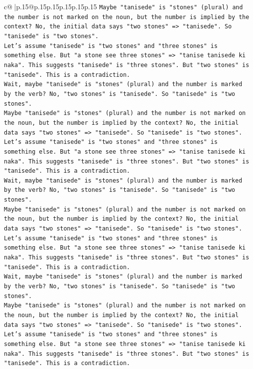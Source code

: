 \documentclass{article}
\begin{document}
{\begin{supertabular}{c@{$\;$}|p{.15\linewidth}@{}p{.15\linewidth}p{.15\linewidth}p{.15\linewidth}p{.15\linewidth}p{.15\linewidth}}
{{{\texttt{Maybe "tanisede" is "stones" (plural) and the number is not marked on the noun, but the number is implied by the context? No, the initial data says "two stones" => "tanisede". So "tanisede" is "two stones".} \\
\texttt{Let's assume "tanisede" is "two stones" and "three stones" is something else. But "a stone see three stones" => "tanise tanisede ki naka". This suggests "tanisede" is "three stones". But "two stones" is "tanisede". This is a contradiction.} \\
\texttt{Wait, maybe "tanisede" is "stones" (plural) and the number is marked by the verb? No, "two stones" is "tanisede". So "tanisede" is "two stones".} \\
\texttt{Maybe "tanisede" is "stones" (plural) and the number is not marked on the noun, but the number is implied by the context? No, the initial data says "two stones" => "tanisede". So "tanisede" is "two stones".} \\
\texttt{Let's assume "tanisede" is "two stones" and "three stones" is something else. But "a stone see three stones" => "tanise tanisede ki naka". This suggests "tanisede" is "three stones". But "two stones" is "tanisede". This is a contradiction.} \\
\texttt{Wait, maybe "tanisede" is "stones" (plural) and the number is marked by the verb? No, "two stones" is "tanisede". So "tanisede" is "two stones".} \\
\texttt{Maybe "tanisede" is "stones" (plural) and the number is not marked on the noun, but the number is implied by the context? No, the initial data says "two stones" => "tanisede". So "tanisede" is "two stones".} \\
\texttt{Let's assume "tanisede" is "two stones" and "three stones" is something else. But "a stone see three stones" => "tanise tanisede ki naka". This suggests "tanisede" is "three stones". But "two stones" is "tanisede". This is a contradiction.} \\
\texttt{Wait, maybe "tanisede" is "stones" (plural) and the number is marked by the verb? No, "two stones" is "tanisede". So "tanisede" is "two stones".} \\
\texttt{Maybe "tanisede" is "stones" (plural) and the number is not marked on the noun, but the number is implied by the context? No, the initial data says "two stones" => "tanisede". So "tanisede" is "two stones".} \\
\texttt{Let's assume "tanisede" is "two stones" and "three stones" is something else. But "a stone see three stones" => "tanise tanisede ki naka". This suggests "tanisede" is "three stones". But "two stones" is "tanisede". This is a contradiction.} \\
}}}
\end{supertabular}}
\end{document}
